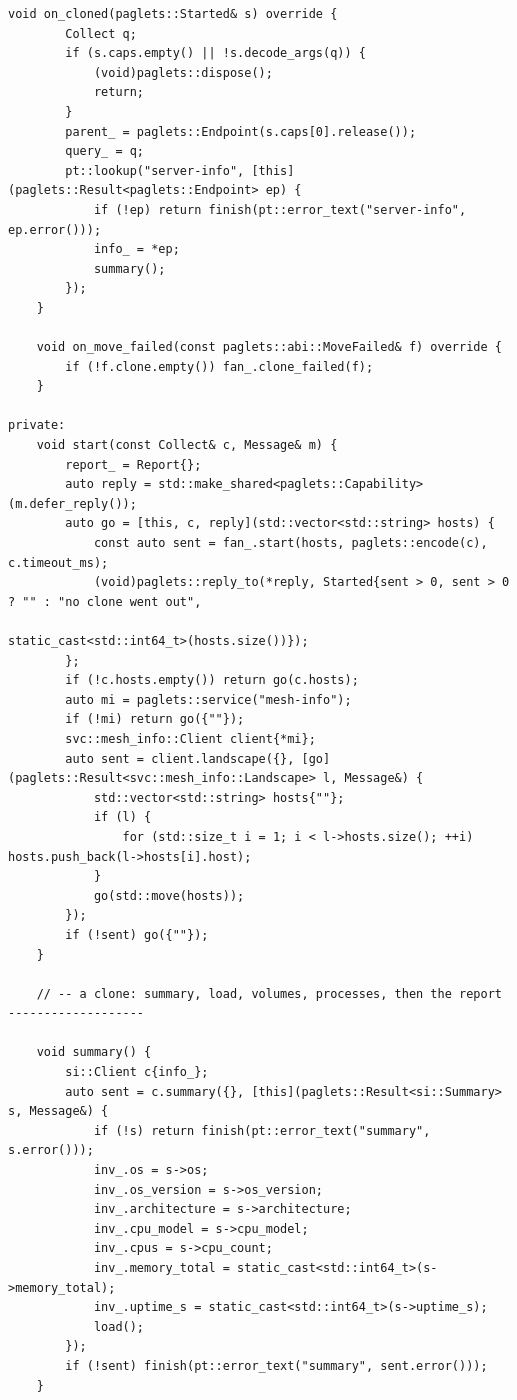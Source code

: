 \begin{lstlisting}[style=paglets-cpp,caption={The Inventory Collector \src{cpp/examples/inventory/inventory.cpp}},label={lst:app-inventory}]
    void on_cloned(paglets::Started& s) override {
        Collect q;
        if (s.caps.empty() || !s.decode_args(q)) {
            (void)paglets::dispose();
            return;
        }
        parent_ = paglets::Endpoint(s.caps[0].release());
        query_ = q;
        pt::lookup("server-info", [this](paglets::Result<paglets::Endpoint> ep) {
            if (!ep) return finish(pt::error_text("server-info", ep.error()));
            info_ = *ep;
            summary();
        });
    }

    void on_move_failed(const paglets::abi::MoveFailed& f) override {
        if (!f.clone.empty()) fan_.clone_failed(f);
    }

private:
    void start(const Collect& c, Message& m) {
        report_ = Report{};
        auto reply = std::make_shared<paglets::Capability>(m.defer_reply());
        auto go = [this, c, reply](std::vector<std::string> hosts) {
            const auto sent = fan_.start(hosts, paglets::encode(c), c.timeout_ms);
            (void)paglets::reply_to(*reply, Started{sent > 0, sent > 0 ? "" : "no clone went out",
                                                    static_cast<std::int64_t>(hosts.size())});
        };
        if (!c.hosts.empty()) return go(c.hosts);
        auto mi = paglets::service("mesh-info");
        if (!mi) return go({""});
        svc::mesh_info::Client client{*mi};
        auto sent = client.landscape({}, [go](paglets::Result<svc::mesh_info::Landscape> l, Message&) {
            std::vector<std::string> hosts{""};
            if (l) {
                for (std::size_t i = 1; i < l->hosts.size(); ++i) hosts.push_back(l->hosts[i].host);
            }
            go(std::move(hosts));
        });
        if (!sent) go({""});
    }

    // -- a clone: summary, load, volumes, processes, then the report -------------------

    void summary() {
        si::Client c{info_};
        auto sent = c.summary({}, [this](paglets::Result<si::Summary> s, Message&) {
            if (!s) return finish(pt::error_text("summary", s.error()));
            inv_.os = s->os;
            inv_.os_version = s->os_version;
            inv_.architecture = s->architecture;
            inv_.cpu_model = s->cpu_model;
            inv_.cpus = s->cpu_count;
            inv_.memory_total = static_cast<std::int64_t>(s->memory_total);
            inv_.uptime_s = static_cast<std::int64_t>(s->uptime_s);
            load();
        });
        if (!sent) finish(pt::error_text("summary", sent.error()));
    }


\end{lstlisting}
